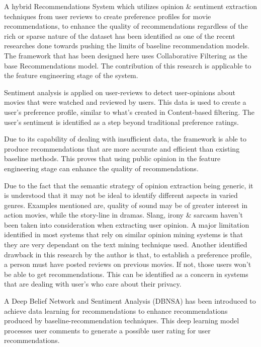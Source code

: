

\bigbreak

A hybrid Recommendations System \autocite{cheng_hybrid_2020} which utilizes opinion \& sentiment extraction techniques from user reviews to create preference profiles for movie recommendations, to enhance the quality of recommendations regardless of the rich or sparse nature of the dataset has been identified as one of the recent researches done towards pushing the limits of baseline recommendation models. The framework that has been designed here uses Collaborative Filtering as the base Recommendations model. The contribution of this research is applicable to the feature engineering stage of the system.

Sentiment analysis is applied on user-reviews to detect user-opinions about movies that were watched and reviewed by users. This data is used to create a user's preference profile, similar to what's created in Content-based filtering. The user's sentiment is identified as a step beyond traditional preference ratings.

Due to its capability of dealing with insufficient data, the framework is able to produce recommendations that are more accurate and efficient than existing baseline methods. This proves that using public opinion in the feature engineering stage can enhance the quality of recommendations.

Due to the fact that the semantic strategy of opinion extraction being generic, it is understood that it may not be ideal to identify different aspects in varied genres. Examples mentioned are, quality of sound may be of greater interest in action movies, while the story-line in dramas.
Slang, irony \& sarcasm haven't been taken into consideration when extracting user opinion.
A major limitation identified in most systems that rely on similar opinion mining systems is that they are very dependant on the text mining technique used. Another identified drawback in this research by the author is that, to establish a preference profile, a person must have posted reviews on previous movies. If not, those users won't be able to get recommendations. This can be identified as a concern in systems that are dealing with user's who care about their privacy.

\bigbreak

A Deep Belief Network and Sentiment Analysis (DBNSA) has been introduced to achieve data learning for recommendations \autocite{chen_user_2019} to enhance recommendations produced by baseline-recommendation techniques. This deep learning model  processes user comments to generate a possible user rating for user recommendations.

